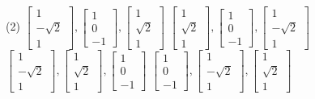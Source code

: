 \begin{enumerate}
  \begin{tasks}(2)
 	\task[\textbf{a.}]$\left[\begin{array}{c}1 \\ -\sqrt{2} \\ 1\end{array}\right],\left[\begin{array}{c}1 \\ 0 \\ -1\end{array}\right],\left[\begin{array}{c}1 \\ \sqrt{2} \\ 1\end{array}\right]$
 	\task[\textbf{b.}]$\left[\begin{array}{c}1 \\ \sqrt{2} \\ 1\end{array}\right],\left[\begin{array}{c}1 \\ 0 \\ -1\end{array}\right],\left[\begin{array}{c}1 \\ -\sqrt{2} \\ 1\end{array}\right]$
 	\task[\textbf{c.}] $\left[\begin{array}{c}1 \\ -\sqrt{2} \\ 1\end{array}\right],\left[\begin{array}{c}1 \\ \sqrt{2} \\ 1\end{array}\right],\left[\begin{array}{c}1 \\ 0 \\ -1\end{array}\right]$
 	\task[\textbf{d.}] $\left[\begin{array}{c}1 \\ 0 \\ -1\end{array}\right],\left[\begin{array}{c}1 \\ -\sqrt{2} \\ 1\end{array}\right],\left[\begin{array}{c}1 \\ \sqrt{2} \\ 1\end{array}\right]$

\end{tasks}
\end{enumerate}
